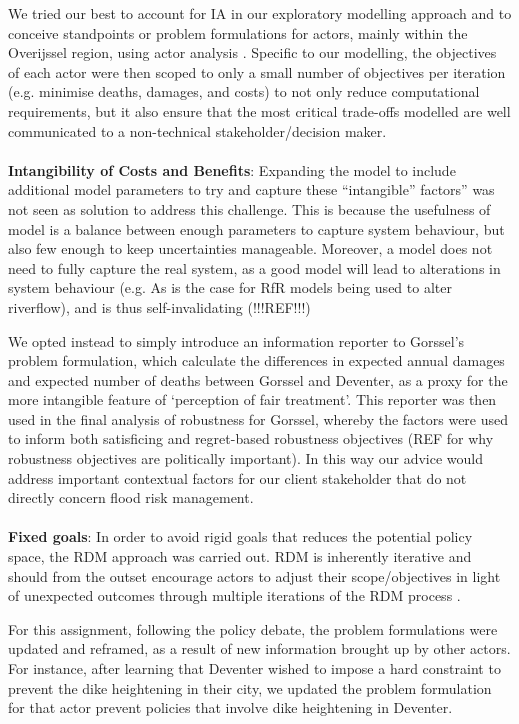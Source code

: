 We tried our best to account for IA in our exploratory modelling approach and to conceive standpoints or problem formulations for actors, mainly within the Overijssel region, using actor analysis \parencite{enserink_policy_2010}. Specific to our modelling, the objectives of each actor were then scoped to only a small number of objectives per iteration (e.g. minimise deaths, damages, and costs) to not only reduce computational requirements, but it also ensure that the most critical trade-offs modelled are well communicated to a non-technical stakeholder/decision maker. 
\\ \\
\textbf{Intangibility of Costs and Benefits}: Expanding the model to include additional model parameters to try and capture these “intangible” factors” was not seen as solution to address this challenge. This is because the usefulness of model is a balance between enough parameters to capture system behaviour, but also few enough to keep uncertainties manageable. Moreover, a model does not need to fully capture the real system, as a good model will lead to alterations in system behaviour (e.g. As is the case for RfR models being used to alter riverflow), and is thus self-invalidating (!!!REF!!!) 

We opted instead to simply introduce an information reporter to Gorssel’s problem formulation, which calculate the differences in expected annual damages and expected number of deaths between Gorssel and Deventer, as a proxy for the more intangible feature of ‘perception of fair treatment’. This reporter was then used in the final analysis of robustness for Gorssel, whereby the factors were used to inform both satisficing and regret-based robustness objectives (REF for why robustness objectives are politically important). In this way our advice would address important contextual factors for our client stakeholder that do not directly concern flood risk management. 
\\ \\
\textbf{Fixed goals}: In order to avoid rigid goals that reduces the potential policy space, the RDM approach was carried out. RDM is inherently iterative and should from the outset encourage actors to adjust their scope/objectives in light of unexpected outcomes through multiple iterations of the RDM process \parencite{lempert_general_2006}. 

For this assignment, following the policy debate, the problem formulations were updated and reframed, as a result of new information brought up by other actors. For instance, after learning that Deventer wished to impose a hard constraint to prevent the dike heightening in their city, we updated the problem formulation for that actor prevent policies that involve dike heightening in Deventer. 

